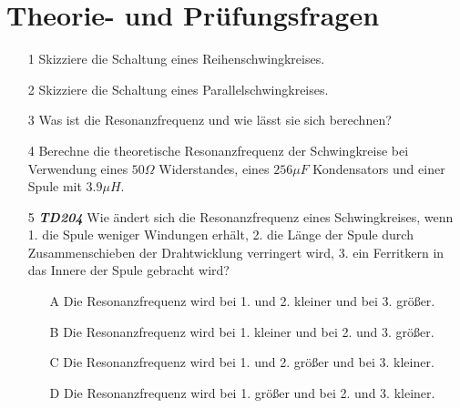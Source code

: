 \section{Theorie- und Prüfungsfragen}


\begin{enumerate}
\itemsep1pt\parskip0pt
\item[1] Skizziere die Schaltung eines Reihenschwingkreises.
\item[2] Skizziere die Schaltung eines Parallelschwingkreises.
\item[3] Was ist die Resonanzfrequenz und wie lässt sie sich berechnen?
\item[4] Berechne die theoretische Resonanzfrequenz der Schwingkreise bei Verwendung eines $50\Omega$ Widerstandes, eines $256\mu F$ Kondensators und einer Spule mit $3.9\mu H$.
\end{enumerate}



\begin{enumerate}
\item[5] \emph{\textbf{TD204}}    Wie ändert sich die Resonanzfrequenz eines Schwingkreises, wenn 1. die Spule weniger Windungen erhält, 2. die Länge der Spule durch Zusammenschieben der Drahtwicklung verringert wird, 3. ein Ferritkern in das Innere der Spule gebracht wird? 
	\begin{enumerate}
	\itemsep1pt\parskip0pt
		\item[A] Die Resonanzfrequenz wird bei 1. und 2. kleiner und bei 3. größer. 
		\item[B] Die Resonanzfrequenz wird bei 1. kleiner und bei 2. und 3. größer.
		\item[C] Die Resonanzfrequenz wird bei 1. und 2. größer und bei 3. kleiner.
		\item[D] Die Resonanzfrequenz wird bei 1. größer und bei 2. und 3. kleiner. 
	\end{enumerate}
\end{enumerate}



